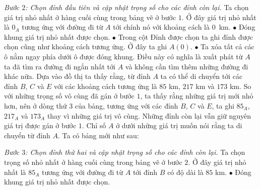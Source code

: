 \begin{multicols}{2}
\begin{table}[H]
		\vspace*{-10pt}
	\end{table}
	\textit{Bước $2$: Chọn đỉnh đầu tiên và cập nhật trọng số cho các đỉnh còn lại.}   
	Ta chọn giá trị nhỏ nhất ở hàng cuối cùng trong bảng vẽ ở bước $1$. Ở đây giá trị nhỏ nhất là $0_A$ tương ứng với đường đi từ $A$ tới chính nó với khoảng cách là $0$~km.
	\vskip 0.1cm
	$\bullet$ Đóng khung giá trị nhỏ nhất được chọn. 
	\vskip 0.1cm
	$\bullet$ Trong cột Đỉnh được chọn ta ghi đỉnh được chọn cũng như khoảng cách tương ứng. Ở đây ta ghi $A(0)$.
	\vskip 0.1cm
	$\bullet$ Ta xóa tất cả các ô nằm ngay phía dưới ô được đóng khung. Điều này có nghĩa là xuất phát từ $A$ ta đã tìm ra đường đi ngắn nhất tới $A$ và không cần tìm thêm những đường đi khác nữa.
	\vskip 0.1cm 
	Dựa vào đồ thị ta thấy rằng, từ đỉnh $A$ ta có thể di chuyển tới các đỉnh $B$, $C$ và $E$ với các khoảng cách tương ứng là $85$ km, $217$ km và $173$ km. So với những trọng số vô cùng đã gán ở bước $1$, ta thấy rằng những giá trị mới nhỏ hơn, nên ở dòng thứ $3$ của bảng, tương ứng với các đỉnh $B$, $C$ và $E$, ta ghi $85_A$, $217_A$ và $173_A$ thay vì những giá trị vô cùng. Những đỉnh còn lại vẫn giữ nguyên giá trị được gán ở bước $1$. Chỉ số $A$ ở dưới những giá trị muốn nói rằng ta di chuyển từ đỉnh $A$.
	\vskip 0.1cm 
	Ta có bảng mới như sau: 
	\begin{table}[H]
		\vspace*{-5pt}
		\centering
		\captionsetup{labelformat= empty, justification=centering}
		\vspace*{-10pt}
	\end{table}
	\textit{Bước $3$: Chọn đỉnh thứ hai và cập nhật trọng số cho các đỉnh còn lại.}  Ta chọn trọng số nhỏ nhất ở hàng cuối cùng trong bảng vẽ ở bước $2$. Ở đây giá trị nhỏ nhất là $85_A$ tương ứng với đường đi từ $A$ tới đỉnh $B$ có độ dài là  $85$ km.
	\vskip 0.1cm
	$\bullet$ Đóng khung giá trị nhỏ nhất được chọn. 

\end{multicols}
